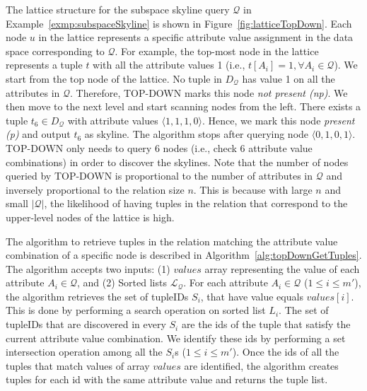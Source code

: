 The lattice structure for the subspace skyline query $\mathcal{Q}$ in Example~\ref{exmp:subspaceSkyline} is shown in Figure~\ref{fig:latticeTopDown}. Each node $u$ in the lattice represents a specific attribute value assignment in the data space corresponding to $\mathcal{Q}$. For example, the top-most node in the lattice represents a tuple $t$ with all the attribute values 1 (i.e., $t[A_i] = 1, \forall A_i \in \mathcal{Q}$). We start from the top node of the lattice. No tuple in $D_{\mathcal{Q}}$ has value 1 on all the attributes in $\mathcal{Q}$. Therefore, TOP-DOWN marks this node \textit{not present (np)}. We then move to the next level and start scanning nodes from the left. There exists a tuple $t_6 \in D_\mathcal{Q}$ with attribute values $\langle 1, 1, 1, 0 \rangle$. Hence, we mark this node \textit{present (p)} and output $t_6$ as skyline. 
The algorithm stops after querying node $\langle 0, 1, 0, 1 \rangle$. %
TOP-DOWN only needs to query 6 nodes (i.e., check 6 attribute value combinations) in order to discover the skylines. Note that the number of nodes queried by TOP-DOWN is proportional to the number of attributes in $\mathcal{Q}$ and inversely proportional to the relation size $n$. This is because with large $n$ and small $|\mathcal{Q}|$, the likelihood of having tuples in the relation that correspond to the upper-level nodes of the lattice is high.

\vspace{1mm}
 The algorithm to retrieve tuples in the relation matching the attribute value combination of a specific node is described in Algorithm~\ref{alg:topDownGetTuples}. The algorithm accepts two inputs: (1) $values$ array representing the value of each attribute $A_i \in \mathcal{Q}$, and (2) Sorted lists $\mathcal{L_Q}$. For each attribute $A_i \in \mathcal{Q}$ ($1 \leq i \leq m'$), the algorithm retrieves the set of tupleIDs $S_i$, that have value equals $values[i]$. This is done by performing a search operation on sorted list $L_i$. %
The set of tupleIDs that are discovered in every $S_i$ are the ids of the tuple that satisfy the current attribute value combination. We identify 
these ids by performing a set intersection operation among all the $S_i$s ($1 \leq i \leq m'$). Once the ids of all the tuples that match 
values of array $values$ are identified, the algorithm creates tuples for each id with the same attribute value and returns the tuple list.

